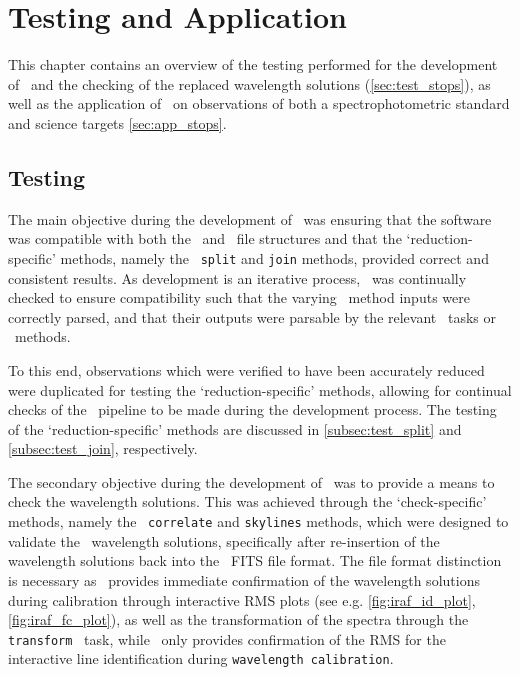 \chapter{Testing and Application}

This chapter contains an overview of the testing performed for the development of \stops\ and the checking of the replaced wavelength solutions (\autoref{sec:test_stops}), as well as the application of \stops\ on observations of both a spectrophotometric standard and science targets \ref{sec:app_stops}.

\section[Testing \textsc{stops}]{Testing \stops} \label{sec:test_stops}



The main objective during the development of \stops\ was ensuring that the software was compatible with both the \polsalt\ and \iraf\ file structures and that the `reduction-specific' methods, namely the \stops\ \texttt{split} and \texttt{join} methods, provided correct and consistent results.
As development is an iterative process, \stops\ was continually checked to ensure compatibility such that the varying \stops\ method inputs were correctly parsed, and that their outputs were parsable by the relevant \iraf\ tasks or \polsalt\ methods.

To this end, observations which were verified to have been accurately reduced were duplicated for testing the `reduction-specific' methods, allowing for continual checks of the \stops\ pipeline to be made during the development process.
The testing of the `reduction-specific' methods are discussed in \autoref{subsec:test_split} and \autoref{subsec:test_join}, respectively.

The secondary objective during the development of \stops\ was to provide a means to check the wavelength solutions.
This was achieved through the `check-specific' methods, namely the \stops\ \texttt{correlate} and \texttt{skylines} methods, which were designed to validate the \iraf\ wavelength solutions, specifically after re-insertion of the wavelength solutions back into the \polsalt\ \gls{FITS} file format.
The file format distinction is necessary as \iraf\ provides immediate confirmation of the wavelength solutions during calibration through interactive \gls{RMS} plots (see e.g. \autoref{fig:iraf_id_plot}, \ref{fig:iraf_fc_plot}), as well as the transformation of the spectra through the \texttt{transform} \iraf\ task, while \polsalt\ only provides confirmation of the \gls{RMS} for the interactive line identification during \texttt{wavelength calibration}.

